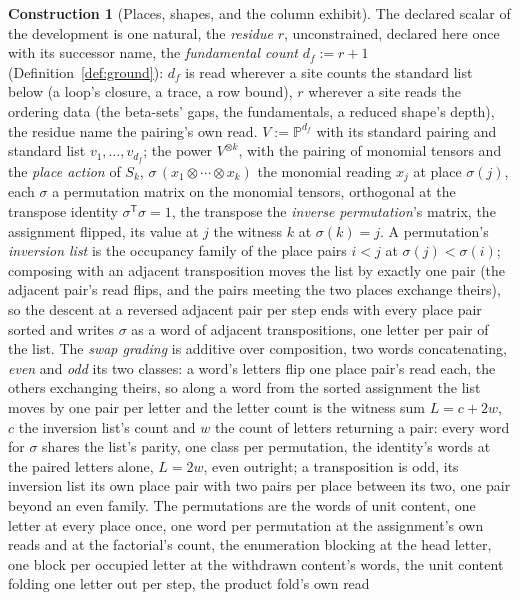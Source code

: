 \documentclass[11pt]{article}
\theoremstyle{definition}
\newtheorem{construction}{Construction}
\begin{document}
\begin{construction}[Places, shapes, and the column exhibit]\label{con:places}
The declared scalar of the development is one natural, the
\emph{residue} $r$, unconstrained, declared here once with its
successor name, the \emph{fundamental count} $d_f:=r+1$
(Definition~\ref{def:ground}): $d_f$ is read wherever a site counts
the standard list below (a loop's closure, a trace, a row bound),
$r$ wherever a site reads the ordering data (the beta-sets'
gaps, the fundamentals, a reduced shape's depth), the residue name the pairing's own read.
$V:=\mathbb P^{d_f}$ with its standard pairing and standard list
$v_1,\dots,v_{d_f}$; the power $V^{\otimes k}$, with the pairing of monomial
tensors and the \emph{place action} of $S_k$,
$\sigma\,(x_1\otimes\cdots\otimes x_k)$ the monomial reading $x_j$
at place $\sigma(j)$, each $\sigma$
a permutation matrix on the monomial tensors, orthogonal at the
transpose identity $\sigma^{\mathsf T}\sigma=1$, the transpose the
\emph{inverse permutation}'s matrix, the assignment flipped, its
value at $j$ the witness $k$ at $\sigma(k)=j$. A permutation's \emph{inversion list}
is the occupancy family of the place pairs $i<j$ at
$\sigma(j)<\sigma(i)$; composing with an adjacent transposition
moves the list by exactly one pair (the adjacent pair's read
flips, and the pairs meeting the two places exchange theirs), so
the descent at a reversed adjacent pair per step ends with every
place pair sorted and writes $\sigma$ as a word of adjacent
transpositions, one letter per pair of the list. The \emph{swap
grading} is additive over composition, two words concatenating,
\emph{even} and \emph{odd} its two classes: a word's letters flip
one place pair's read each, the others exchanging theirs, so along
a word from the sorted assignment the list moves by one pair per
letter and the letter count is the witness sum $L=c+2w$, $c$ the
inversion list's count and $w$ the count of letters returning a
pair: every word for $\sigma$ shares the list's parity, one class
per permutation, the identity's words at the paired letters alone,
$L=2w$, even outright; a
transposition is odd, its inversion list its own place pair with
two pairs per place between its two, one pair beyond an even
family. The permutations are the words of unit content, one
letter at every place once, one word per permutation at the
assignment's own reads and at the factorial's count, the
enumeration blocking at the head letter, one block per occupied
letter at the withdrawn content's words, the unit content folding
one letter out per step, the product fold's own read

\end{construction}
\end{document}
